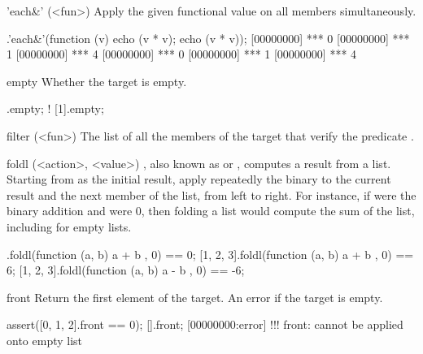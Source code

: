 \begin{urbiscriptapi}

\item['each&'](<fun>)%
Apply the given functional value on all members simultaneously.

\begin{urbiscript}
[0, 1, 2].'each&'(function (v) {echo (v * v); echo (v * v)});
[00000000] *** 0
[00000000] *** 1
[00000000] *** 4
[00000000] *** 0
[00000000] *** 1
[00000000] *** 4
\end{urbiscript}

\item[empty]
  Whether the target is empty.

\begin{urbiassert}
   [].empty;
! [1].empty;
\end{urbiassert}

\item[filter](<fun>)%
  The list of all the members of the target that verify the predicate
  .


\item[foldl](<action>, <value>)%
  ,
  also known as  or , computes a result
  from a list.  Starting from  as the initial result, apply
  repeatedly the binary  to the current result and the
  next member of the list, from left to right.  For instance, if
   were the binary addition and  were 0, then
  folding a list would compute the sum of the list, including for
  empty lists.

\begin{urbiassert}
       [].foldl(function (a, b) { a + b }, 0) == 0;
[1, 2, 3].foldl(function (a, b) { a + b }, 0) == 6;
[1, 2, 3].foldl(function (a, b) { a - b }, 0) == -6;
\end{urbiassert}

\item[front]
  Return the first element of the target. An error if the target is
  empty.
\begin{urbiscript}
assert([0, 1, 2].front == 0);
[].front;
[00000000:error] !!! front: cannot be applied onto empty list
\end{urbiscript}


\end{urbiscriptapi}
